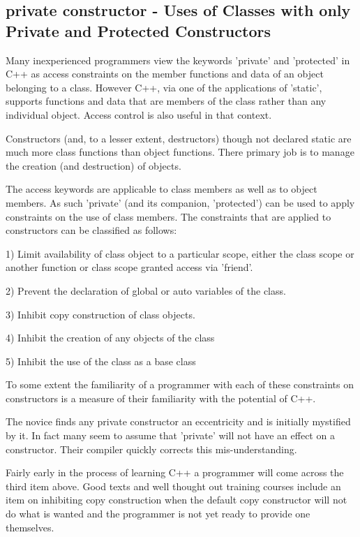 \documentclass{book}
\begin{document}
\subsection{private constructor - Uses of Classes with only Private and Protected Constructors}
Many inexperienced programmers view the keywords 'private' and 'protected' in C++ as access constraints on the member functions and data of an object belonging to a class.
However C++, via one of the applications of 'static', supports functions and data that are members of the class rather than any individual object. Access control is also useful in that context.

Constructors (and, to a lesser extent, destructors) though not declared static are much more class functions than object functions.
There primary job is to manage the creation (and destruction) of objects.

The access keywords are applicable to class members as well as to object members. As such 'private' (and its companion, 'protected') can be used to apply constraints on the use of class members.
The constraints that are applied to constructors can be classified as follows:

1) Limit availability of class object to a particular scope, either the class scope or another function or class scope granted access via 'friend'.

2) Prevent the declaration of global or auto variables of the class.

3) Inhibit copy construction of class objects.

4) Inhibit the creation of any objects of the class

5) Inhibit the use of the class as a base class

To some extent the familiarity of a programmer with each of these constraints on constructors is a measure of their familiarity with the potential of C++.

The novice finds any private constructor an eccentricity and is initially mystified by it. In fact many seem to assume that 'private' will not have an effect on a constructor.
Their compiler quickly corrects this mis-understanding.

Fairly early in the process of learning C++ a programmer will come across the third item above. 
Good texts and well thought out training courses include an item on inhibiting copy construction when the default copy constructor will not do what is wanted and 
the programmer is not yet ready to provide one themselves.
\end{document}
